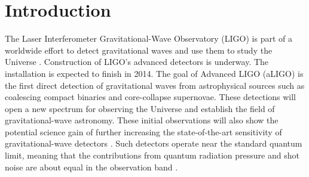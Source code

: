 \section{Introduction}
\label{sec:int}

The Laser Interferometer Gravitational-Wave Observatory (LIGO) is part of a worldwide 
effort to detect gravitational waves and use them to study the Universe \cite{BPAbbott09}. Construction of 
LIGO's advanced detectors is underway. The installation is expected to finish in 2014. The goal of Advanced LIGO (aLIGO) is the first direct detection of gravitational waves 
from astrophysical sources such as coalescing compact binaries and core-collapse supernovae.
These detections will open a new spectrum for observing the Universe and establish the field of 
gravitational-wave astronomy. 
These initial observations will also show the potential science gain of further increasing the state-of-the-art sensitivity of gravitational-wave detectors \cite{Smith09,Harry10,Losurdo12}. Such detectors operate near the standard quantum limit, meaning that the contributions from quantum radiation pressure and shot noise are about equal in the observation band \cite{Caves80, Ni86}.

